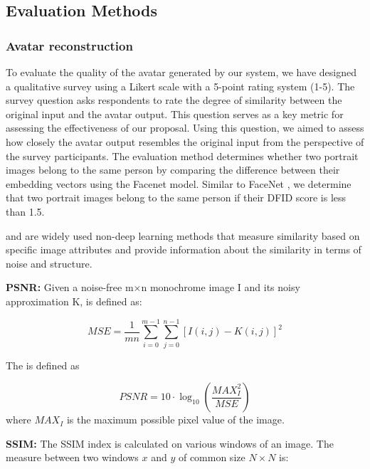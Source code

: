 \subsection{Evaluation Methods}
\subsubsection{Avatar reconstruction}
\label{sec:result/avatar-reconstruction}
To evaluate the quality of the avatar generated by our system, we have designed a qualitative survey using a Likert scale with a 5-point rating system (1-5). The survey question asks respondents to rate the degree of similarity between the original input and the avatar output. This question serves as a key metric for assessing the effectiveness of our proposal.
Using this question, we aimed to assess how closely the avatar output resembles the original input from the perspective of the survey participants.
The  \cite{zhuangMoFaNeRFMorphableFacial2022} evaluation method determines whether two portrait images belong to the same person by comparing the difference between their embedding vectors using the Facenet model. Similar to FaceNet \cite{schroffFaceNetUnifiedEmbedding2015}, we determine that two portrait images belong to the same person if their DFID score is less than 1.5.

 and  are widely used non-deep learning methods that measure similarity based on specific image attributes and provide information about the similarity in terms of noise and structure.

\textbf{PSNR:} Given a noise-free m×n monochrome image I and its noisy approximation K,  is defined as:

\begin{equation}
    MSE = \frac{1}{mn}\sum_{i=0}^{m-1}\sum_{j=0}^{n-1}[I(i,j)-K(i,j)]^2
\end{equation}

The  is defined as

\begin{equation}
    PSNR = 10\cdot\log_{10}\left(\frac{MAX_I^2}{MSE}\right)
\end{equation}
where $MAX_{I}$ is the maximum possible pixel value of the image.

\textbf{SSIM:} The SSIM index is calculated on various windows of an image. The measure between two windows $x$ and $y$ of common size $N \times N$ is:

